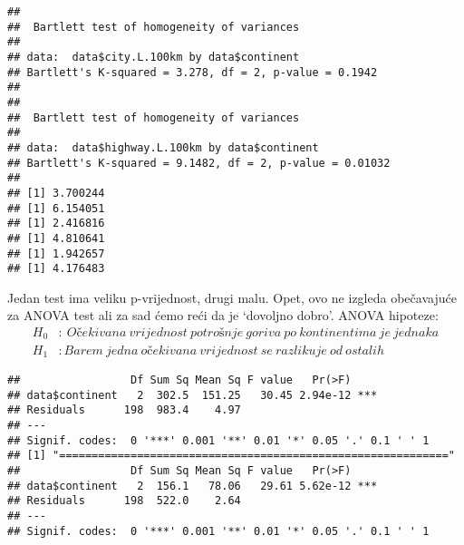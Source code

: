 \documentclass[
]{article}
\newenvironment{Shaded}{\begin{snugshade}}{\end{snugshade}}
\newcommand{\FloatTok}[1]{\textcolor[rgb]{0.00,0.00,0.81}{#1}}
\newcommand{\FunctionTok}[1]{\textcolor[rgb]{0.13,0.29,0.53}{\textbf{#1}}}
\newcommand{\NormalTok}[1]{#1}
\newcommand{\OtherTok}[1]{\textcolor[rgb]{0.56,0.35,0.01}{#1}}
\newcommand{\SpecialCharTok}[1]{\textcolor[rgb]{0.81,0.36,0.00}{\textbf{#1}}}
\newcommand{\StringTok}[1]{\textcolor[rgb]{0.31,0.60,0.02}{#1}}
\begin{document}
\begin{verbatim}
## 
##  Bartlett test of homogeneity of variances
## 
## data:  data$city.L.100km by data$continent
## Bartlett's K-squared = 3.278, df = 2, p-value = 0.1942
## 
## 
##  Bartlett test of homogeneity of variances
## 
## data:  data$highway.L.100km by data$continent
## Bartlett's K-squared = 9.1482, df = 2, p-value = 0.01032
## 
## [1] 3.700244
## [1] 6.154051
## [1] 2.416816
## [1] 4.810641
## [1] 1.942657
## [1] 4.176483
\end{verbatim}

Jedan test ima veliku p-vrijednost, drugi malu. Opet, ovo ne izgleda
obečavajuće za ANOVA test ali za sad ćemo reći da je `dovoljno dobro'.
ANOVA hipoteze: \[\begin{aligned}
H_0 &:\ Očekivana\ vrijednost\ potrošnje\ goriva\ po\ kontinentima\ je\ jednaka\\
H_1 &: Barem\ jedna\ očekivana\ vrijednost\ se\ razlikuje\ od\ ostalih
\end{aligned}\]

\begin{Shaded}
\end{Shaded}

\begin{verbatim}
##                 Df Sum Sq Mean Sq F value   Pr(>F)    
## data$continent   2  302.5  151.25   30.45 2.94e-12 ***
## Residuals      198  983.4    4.97                     
## ---
## Signif. codes:  0 '***' 0.001 '**' 0.01 '*' 0.05 '.' 0.1 ' ' 1
## [1] "============================================================"
##                 Df Sum Sq Mean Sq F value   Pr(>F)    
## data$continent   2  156.1   78.06   29.61 5.62e-12 ***
## Residuals      198  522.0    2.64                     
## ---
## Signif. codes:  0 '***' 0.001 '**' 0.01 '*' 0.05 '.' 0.1 ' ' 1
\end{verbatim}
\end{document}

